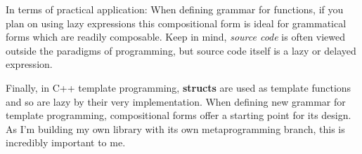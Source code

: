 \documentclass[twoside]{article}
\begin{document}
In terms of practical application: When defining grammar for functions, if you plan on using lazy expressions
this compositional form is ideal for grammatical forms which are readily composable. Keep in mind, \emph{source code}
is often viewed outside the paradigms of programming, but source code itself is a lazy or delayed expression.

Finally, in C++ template programming, {\bf structs} are used as template functions and so are lazy by their
very implementation. When defining new grammar for template programming, compositional forms offer a starting point
for its design. As I'm building my own library with its own metaprogramming branch, this is incredibly important
to me.

%
%
%
%
%
%
%
%
%
%
%
%
%
%
%
%
%
%
%
%
\end{document}
